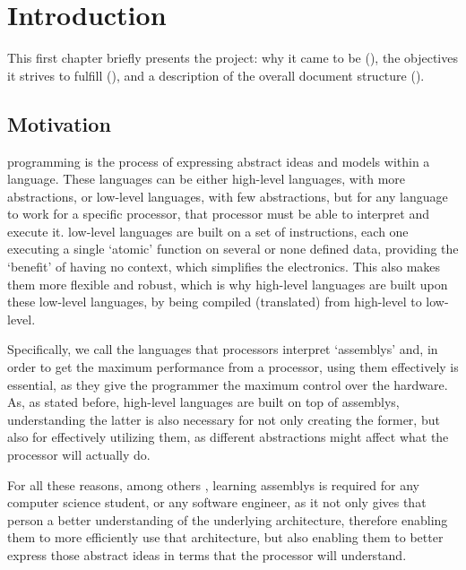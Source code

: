 \chapter{Introduction}
This first chapter briefly presents the project: why it came to be (), the objectives it strives to fulfill (), and a description of the overall document structure ().


\section{Motivation}\label{sec:motivation}

\Gls{programming} is the process of expressing abstract ideas and models within a language. These languages can be either \glspl{high-level language}, with more abstractions, or \glspl{low-level language}, with few abstractions, but for any language to work for a specific \gls{processor}, that \gls{processor} must be able to interpret and execute it. \Glspl{low-level language} are built on a set of instructions, each one executing a single `atomic' function on several or none defined data, providing the `benefit' of having no context, which simplifies the electronics. This also makes them more flexible and robust, which is why \glspl{high-level language} are built upon these \glspl{low-level language}, by being compiled (translated) from high-level to low-level.

Specifically, we call  the languages that processors interpret `\glspl{assembly}' and, in order to get the maximum performance from a \gls{processor}, using them effectively is essential, as they give the \gls{programmer} the maximum control over the hardware. As, as stated before, \glspl{high-level language} are built on top of \glspl{assembly}, understanding the latter is also necessary for not only creating the former, but also for effectively utilizing them, as different abstractions might affect what the \gls{processor} will actually do.

For all these reasons, among others \supercite{jorgensen2019x86}, learning \glspl{assembly} is required for any \gls{computer science} student, or any \gls{software engineer}, as it not only gives that person a better understanding of the underlying architecture, therefore enabling them to more efficiently use that architecture, but also enabling them to better express those abstract ideas in terms that the \gls{processor} will understand.


